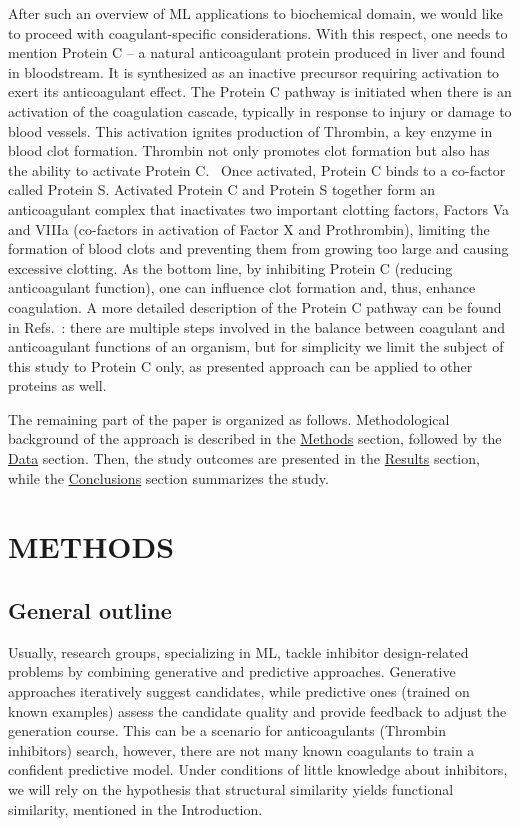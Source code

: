\documentclass[12pt]{article}
\begin{document}
After such an overview of ML applications to biochemical domain, we would like to proceed with coagulant-specific considerations.
With this respect, one needs to mention Protein C -- a natural anticoagulant protein produced in liver and found in bloodstream.
It is synthesized as an inactive precursor requiring activation to exert its anticoagulant effect.
The Protein C pathway is initiated when there is an activation of the coagulation cascade, typically in response to injury or damage to blood vessels.
This activation ignites production of Thrombin, a key enzyme in blood clot formation.
Thrombin not only promotes clot formation but also has the ability to activate Protein C.~\cite{Kisiel1979}
Once activated, Protein C binds to a co-factor called Protein S.
Activated Protein C and Protein S together form an anticoagulant complex that inactivates two important clotting factors, Factors Va and VIIIa (co-factors in activation of Factor X and Prothrombin), limiting the formation of blood clots and preventing them from growing too large and causing excessive clotting.
As the bottom line, by inhibiting Protein C (reducing anticoagulant function), one can influence clot formation and, thus, enhance coagulation.
A more detailed description of the Protein C pathway can be found in Refs.~: there are multiple steps involved in the balance between coagulant and anticoagulant functions of an organism, but for simplicity we limit the subject of this study to Protein C only, as presented approach can be applied to other proteins as well.

The remaining part of the paper is organized as follows. 
Methodological background of the approach is described in the \hyperref[sec:Methods]{Methods} section, followed by the \hyperref[sec:Data]{Data} section.
Then, the study outcomes are presented in the \hyperref[sec:Results]{Results} section, 
while the \hyperref[sec:Conclusions]{Conclusions} section summarizes the study.


\section*{\sffamily \Large METHODS}
\label{sec:Methods}

\subsection*{\sffamily \large General outline}

Usually, research groups, specializing in ML, tackle inhibitor design-related problems by combining generative and predictive approaches.
Generative approaches iteratively suggest candidates, while predictive ones (trained on known examples) assess the candidate quality and provide feedback to adjust the generation course.
This can be a scenario for anticoagulants (Thrombin inhibitors) search, however, there are not many known coagulants to train a confident predictive model.
Under conditions of little knowledge about inhibitors, we will rely on the hypothesis that structural similarity yields functional similarity, mentioned in the Introduction.
\end{document}
